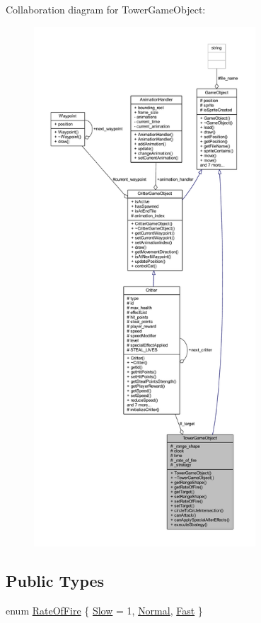 Collaboration diagram for Tower\+Game\+Object\+:
\nopagebreak
\begin{figure}[H]
\begin{center}
\leavevmode
\includegraphics[height=550pt]{class_tower_game_object__coll__graph}
\end{center}
\end{figure}
\subsection*{Public Types}
\begin{DoxyCompactItemize}
\item 
enum \hyperlink{class_tower_game_object_a6a687237ad352e41acb35f8b4cf25fa3}{Rate\+Of\+Fire} \{ \hyperlink{class_tower_game_object_a6a687237ad352e41acb35f8b4cf25fa3a121781111da145b0477ca824e28a2d62}{Slow} = 1, 
\hyperlink{class_tower_game_object_a6a687237ad352e41acb35f8b4cf25fa3a1452f172c386f95f93e0da09e0381aef}{Normal}, 
\hyperlink{class_tower_game_object_a6a687237ad352e41acb35f8b4cf25fa3a646a1a6a2369018ea562acb0299de468}{Fast}
 \}
\end{DoxyCompactItemize}
